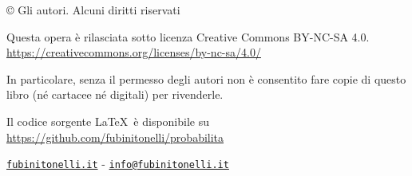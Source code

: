 © Gli autori. Alcuni diritti riservati

Questa opera è rilasciata sotto licenza Creative Commons BY-NC-SA 4.0.\\
\url{https://creativecommons.org/licenses/by-nc-sa/4.0/}

In particolare, senza il permesso degli autori non è consentito fare copie di questo libro (né cartacee né digitali) per rivenderle.

Il codice sorgente \LaTeX \ è disponibile su \\
\url{https://github.com/fubinitonelli/probabilita}

\href{https://fubinitonelli.it}{\texttt{fubinitonelli.it}} - \href{mailto:info@fubinitonelli.it}{\texttt{info@fubinitonelli.it}}
